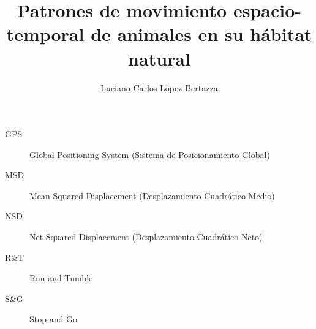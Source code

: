 \documentclass[12pt,screen,twoside,pagebackref]{ibtesis}
\title{Patrones de movimiento espacio-temporal de animales en su hábitat natural}
\author{Luciano Carlos Lopez Bertazza}
\begin{document}

\begin{preliminary}



\begin{abreviaturas}
\begin{description}
    \item[GPS] Global Positioning System (Sistema de Posicionamiento Global)
    \item[MSD] Mean Squared Displacement (Desplazamiento Cuadrático Medio)
    \item[NSD] Net Squared Displacement (Desplazamiento Cuadrático Neto)
    \item[R$\&$T] Run and Tumble
    \item[S$\&$G] Stop and Go  
\end{description}
\end{abreviaturas}

\tableofcontents                %

\listoffigures                  %

\listoftables                   %



\end{preliminary}







\appendix






\begin{biblio}

\end{biblio}
\end{document}
